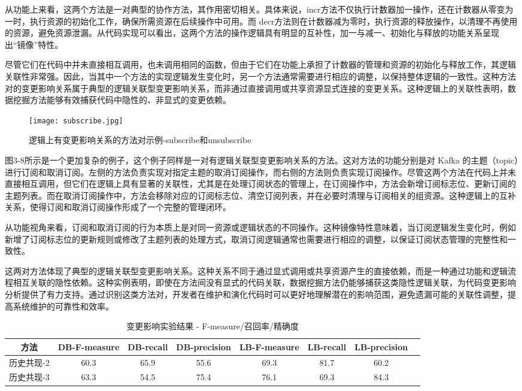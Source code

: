 从功能上来看，这两个方法是一对典型的协作方法，其作用密切相关。具体来说，incr方法不仅执行计数器加一操作，还在计数器从零变为一时，执行资源的初始化工作，确保所需资源在后续操作中可用。而 decr方法则在计数器减为零时，执行资源的释放操作，以清理不再使用的资源，避免资源泄漏。从代码实现可以看出，这两个方法的操作逻辑具有明显的互补性，加一与减一、初始化与释放的功能关系呈现出“镜像”特性。

尽管它们在代码中并未直接相互调用，也未调用相同的函数，但由于它们在功能上承担了计数器的管理和资源的初始化与释放工作，其逻辑关联性非常强。因此，当其中一个方法的实现逻辑发生变化时，另一个方法通常需要进行相应的调整，以保持整体逻辑的一致性。这种方法对的变更影响关系属于典型的逻辑关联型变更影响关系，而非通过直接调用或共享资源显式连接的变更关系。这种逻辑上的关联性表明，数据挖掘方法能够有效捕获代码中隐性的、非显式的变更依赖。

\begin{figure}[h]
\centering
\texttt{[image: subscribe.jpg]}
\caption{逻辑上有变更影响关系的方法对示例-subscribe和unsubscribe}
\end{figure}

图3-8所示是一个更加复杂的例子，这个例子同样是一对有逻辑关联型变更影响关系的方法。这对方法的功能分别是对 Kafka 的主题（topic）进行订阅和取消订阅。左侧的方法负责实现对指定主题的取消订阅操作，而右侧的方法则负责实现订阅操作。尽管这两个方法在代码上并未直接相互调用，但它们在逻辑上具有显著的关联性，尤其是在处理订阅状态的管理上，在订阅操作中，方法会新增订阅标志位、更新订阅的主题列表。而在取消订阅操作中，方法会移除对应的订阅标志位、清空订阅列表，并在必要时清理与订阅相关的组资源。这种逻辑上的互补关系，使得订阅和取消订阅操作形成了一个完整的管理闭环。

从功能视角来看，订阅和取消订阅的行为本质上是对同一资源或逻辑状态的不同操作。这种镜像特性意味着，当订阅逻辑发生变化时，例如新增了订阅标志位的更新规则或修改了主题列表的处理方式，取消订阅逻辑通常也需要进行相应的调整，以保证订阅状态管理的完整性和一致性。

这两对方法体现了典型的逻辑关联型变更影响关系。这种关系不同于通过显式调用或共享资源产生的直接依赖，而是一种通过功能和逻辑流程相互关联的隐性依赖。这种实例表明，即使在方法间没有显式的代码关联，数据挖掘方法仍能够捕获这类隐性逻辑关联，为代码变更影响分析提供了有力支持。通过识别这类方法对，开发者在维护和演化代码时可以更好地理解潜在的影响范围，避免遗漏可能的关联性调整，提高系统维护的可靠性和效率。

    \begin{table}[htbp]
    \caption{变更影响实验结果 - F-measure/召回率/精确度}
    \vspace{0.5em}\centering\wuhao
    \begin{tabular}{cccccccc}
    \toprule
    方法 & DB-F-measure & DB-recall & DB-precision & LB-F-measure & LB-recall & LB-precision  \\
    \midrule
    历史共现-2 & 60.3 & 65.9 & 55.6 & 69.3 & 81.7 & 60.2 \\
    历史共现-3 & 63.3 & 54.5 & 75.4 & 76.1 & 69.3 & 84.3 \\
    \bottomrule
    \end{tabular}
    \end{table}

